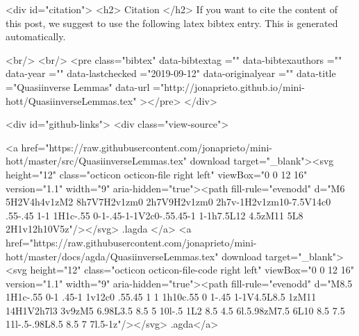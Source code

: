   
  <div id="citation">
  <h2> Citation </h2>
  If you want to cite the content of this post,
  we suggest to use the following latex bibtex entry.
  This is generated automatically.

  <br/>
  <br/>
  <pre class="bibtex"
       data-bibtextag =""
       data-bibtexauthors =""
       data-year =""
       data-lastchecked ="2019-09-12"
       data-originalyear =""
       data-title ="Quasiinverse Lemmas"
       data-url ="http://jonaprieto.github.io/mini-hott/QuasiinverseLemmas.tex"
  ></pre>
  </div>
  

  <div id="github-links">
    <div class="view-source">
      
        <a href="https://raw.githubusercontent.com/jonaprieto/mini-hott/master/src/QuasiinverseLemmas.tex" download target="_blank"><svg height="12" class="octicon octicon-file right left" viewBox="0 0 12 16" version="1.1" width="9" aria-hidden="true"><path fill-rule="evenodd" d="M6 5H2V4h4v1zM2 8h7V7H2v1zm0 2h7V9H2v1zm0 2h7v-1H2v1zm10-7.5V14c0 .55-.45 1-1 1H1c-.55 0-1-.45-1-1V2c0-.55.45-1 1-1h7.5L12 4.5zM11 5L8 2H1v12h10V5z"/></svg> .lagda </a>
        <a href="https://raw.githubusercontent.com/jonaprieto/mini-hott/master/docs/agda/QuasiinverseLemmas.tex" download target="_blank"><svg height="12" class="octicon octicon-file-code right left" viewBox="0 0 12 16" version="1.1" width="9" aria-hidden="true"><path fill-rule="evenodd" d="M8.5 1H1c-.55 0-1 .45-1 1v12c0 .55.45 1 1 1h10c.55 0 1-.45 1-1V4.5L8.5 1zM11 14H1V2h7l3 3v9zM5 6.98L3.5 8.5 5 10l-.5 1L2 8.5 4.5 6l.5.98zM7.5 6L10 8.5 7.5 11l-.5-.98L8.5 8.5 7 7l.5-1z"/></svg> .agda</a>
      
